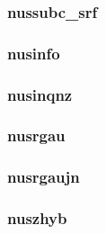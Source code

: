 \subsubsection{nussubc\_srf}

\subsubsection{nusinfo}
\subsubsection{nusinqnz}
\subsubsection{nusrgau}
\subsubsection{nusrgaujn}
\subsubsection{nuszhyb}

